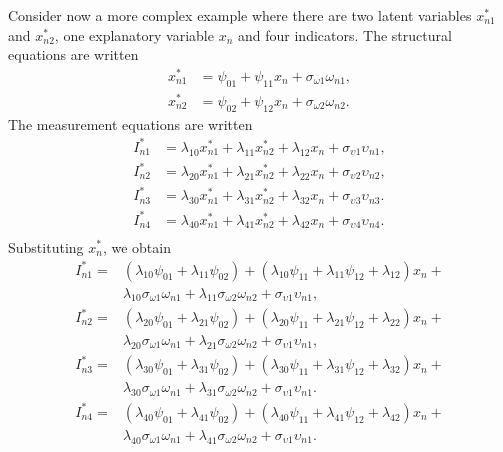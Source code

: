 \documentclass[12pt,a4paper]{article}
\begin{document}
Consider now a more complex example where there are two latent variables $x^*_{n1}$ and $x^*_{n2}$, one explanatory variable $x_n$ and four indicators. The structural equations  are written
\[
\begin{aligned}
x^*_{n1} &= \psi_{01} + \psi_{11} x_{n} + \sigma_{\omega 1} \omega_{n1}, \\
x^*_{n2} &= \psi_{02} + \psi_{12} x_{n} + \sigma_{\omega 2} \omega_{n2}.
\end{aligned}
\]
The measurement equations  are written
\[
\begin{aligned}
I^*_{n1} &= \lambda_{10}  x_{n1}^* + \lambda_{11}  x_{n2}^* +\lambda_{12} x_{n} + \sigma_{\upsilon 1} \upsilon_{n1}, \\
I^*_{n2} &= \lambda_{20}  x_{n1}^* + \lambda_{21}  x_{n2}^* +\lambda_{22} x_{n} + \sigma_{\upsilon 2} \upsilon_{n2}, \\
I^*_{n3} &= \lambda_{30}  x_{n1}^* + \lambda_{31}  x_{n2}^* +\lambda_{32} x_{n} + \sigma_{\upsilon 3} \upsilon_{n3}. \\
I^*_{n4} &= \lambda_{40}  x_{n1}^* + \lambda_{41}  x_{n2}^* +\lambda_{42} x_{n} + \sigma_{\upsilon 4} \upsilon_{n4}. \\
\end{aligned}
\]
Substituting $x^*_{n}$, we obtain
\[
\begin{aligned}
  I^*_{n1} =&  (\lambda_{10}  \psi_{01}+ \lambda_{11} \psi_{02} ) + (\lambda_{10}\psi_{11}+ \lambda_{11} \psi_{12} +\lambda_{12}) x_{n} + \\
  & \lambda_{10}\sigma_{\omega 1} \omega_{n1}  + \lambda_{11} \sigma_{\omega 2} \omega_{n2}  + \sigma_{\upsilon 1} \upsilon_{n1}, \\
  I^*_{n2} =& (\lambda_{20}  \psi_{01}+ \lambda_{21} \psi_{02} ) + (\lambda_{20}\psi_{11}+ \lambda_{21} \psi_{12} +\lambda_{22}) x_{n} + \\
  & \lambda_{20}\sigma_{\omega 1} \omega_{n1}  + \lambda_{21} \sigma_{\omega 2} \omega_{n2}  + \sigma_{\upsilon 1} \upsilon_{n1}, \\
  I^*_{n3} =& (\lambda_{30}  \psi_{01}+ \lambda_{31} \psi_{02} ) + (\lambda_{30}\psi_{11}+ \lambda_{31} \psi_{12} +\lambda_{32}) x_{n} + \\
  & \lambda_{30}\sigma_{\omega 1} \omega_{n1}  + \lambda_{31} \sigma_{\omega 2} \omega_{n2}  + \sigma_{\upsilon 1} \upsilon_{n1}. \\
  I^*_{n4} =& (\lambda_{40}  \psi_{01}+ \lambda_{41} \psi_{02} ) + (\lambda_{40}\psi_{11}+ \lambda_{41} \psi_{12} +\lambda_{42}) x_{n} + \\
  & \lambda_{40}\sigma_{\omega 1} \omega_{n1}  + \lambda_{41} \sigma_{\omega 2} \omega_{n2}  + \sigma_{\upsilon 1} \upsilon_{n1}. \\
\end{aligned}
\]
\end{document}
